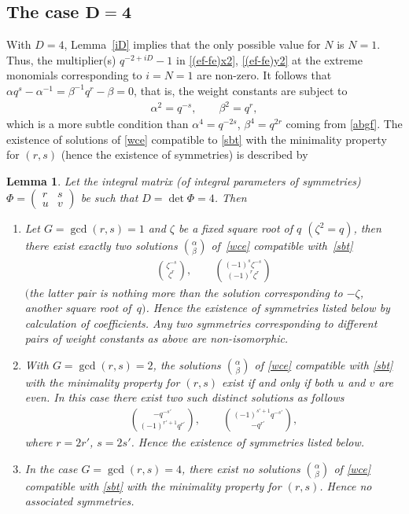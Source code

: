 \documentclass[pdftex]{sigma}
\numberwithin{equation}{section}
\newtheorem{Lemma}[Theorem]{Lemma}
\begin{document}
\subsection[The case $D=4$]{The case $\boldsymbol{D=4}$}

With $D=4$, Lemma~\ref{iD} implies that the only possible value for $N$ is $N=1$. Thus, the multiplier(s) $q^{-2+iD}-1$ in \eqref{(ef-fe)x2}, \eqref{(ef-fe)y2} at the extreme monomials corresponding to $i=N=1$ are non-zero. It follows that $\alpha q^s-\alpha^{-1}=\beta^{-1}q^r-\beta=0$, that is, the weight constants are subject to
\begin{gather}\label{sbt}
\alpha^2=q^{-s},\qquad\beta^2=q^r,
\end{gather}
which is a more subtle condition than $\alpha^4=q^{-2s}$, $\beta^4=q^{2r}$ coming from \eqref{abgf}. The existence of solutions of \eqref{wce} compatible to \eqref{sbt} with the minimality property for $(r,s)$ (hence the existence of symmetries) is described by

\begin{Lemma}\label{lem_det4}
Let the integral matrix (of integral parameters of symmetries) $\Phi=\left(\begin{smallmatrix}r & s\\ u & v\end{smallmatrix}\right)$ be such that $D=\det\Phi=4$. Then
\begin{enumerate}\itemsep=0pt
\item[$1.$] Let $G=\operatorname{gcd}(r,s)=1$ and $\zeta$ be a fixed square root of $q$ $(\zeta^2=q)$, then there exist exactly two solutions $\binom{\alpha}{\beta}$ of~\eqref{wce} compatible with~\eqref{sbt}
 \begin{gather*}
 \binom{\zeta^{-s}}{\zeta^r},\qquad\binom{(-1)^s\zeta^{-s}}{(-1)^r\zeta^r}
 \end{gather*}
$($the latter pair is nothing more than the solution corresponding to $-\zeta$, another square root of~$q)$. Hence the existence of symmetries listed below by calculation of coefficients. Any two symmetries corresponding to different pairs of weight constants as above are non-isomorphic.
\item[$2.$] With $G=\operatorname{gcd}(r,s)=2$, the solutions $\binom{\alpha}{\beta}$ of \eqref{wce} compatible with \eqref{sbt} with the minima\-li\-ty property for $(r,s)$ exist if and only if both $u$ and $v$ are even. In this case there exist two such distinct solutions as follows{\samepage
 \begin{gather*}
 \binom{-q^{-s'}}{(-1)^{r'+1}q^{r'}},\qquad \binom{(-1)^{s'+1}q^{-s'}}{-q^{r'}},
 \end{gather*}
 where $r=2r'$, $s=2s'$. Hence the existence of symmetries listed below.}
\item[$3.$] In the case $G=\operatorname{gcd}(r,s)=4$, there exist no solutions $\binom{\alpha}{\beta}$ of \eqref{wce} compatible with \eqref{sbt} with the minimality property for $(r,s)$. Hence no associated symmetries.
\end{enumerate}
\end{Lemma}
\end{document}

